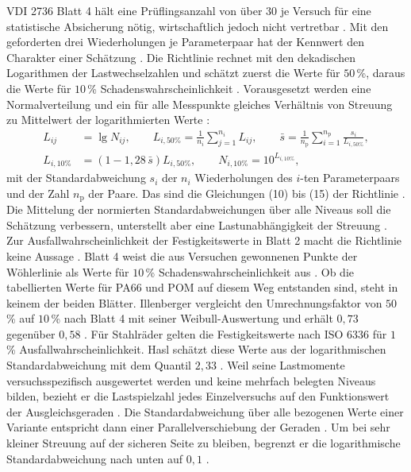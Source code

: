 VDI 2736 Blatt 4 hält eine Prüflingsanzahl von über 30 je Versuch für eine statistische Absicherung nötig, wirtschaftlich jedoch nicht vertretbar \cite[Abschnitt~4, S.~8 bis 9]{VDI2736-4}. Mit den geforderten drei Wiederholungen je Parameterpaar hat der Kennwert den Charakter einer Schätzung \cite[S.~9]{VDI2736-4}. Die Richtlinie rechnet mit den dekadischen Logarithmen der Lastwechselzahlen und schätzt zuerst die Werte für $50$\,\%, daraus die Werte für $10$\,\% Schadenswahrscheinlichkeit \cite[S.~9]{VDI2736-4}. Vorausgesetzt werden eine Normalverteilung und ein für alle Messpunkte gleiches Verhältnis von Streuung zu Mittelwert der logarithmierten Werte \cite[S.~9]{VDI2736-4}:
\begin{equation}
    \begin{aligned}
        L_{ij}     & = \lg N_{ij} , \qquad
        L_{i,50\%} = \frac{1}{n_{i}} \sum_{j=1}^{n_{i}} L_{ij} , \qquad
        \bar{s} = \frac{1}{n_{\mathrm{p}}} \sum_{i=1}^{n_{\mathrm{p}}} \frac{s_{i}}{L_{i,50\%}} , \\
        L_{i,10\%} & = \left(1 - 1{,}28\,\bar{s}\right) L_{i,50\%} , \qquad
        N_{i,10\%} = 10^{L_{i,10\%}} ,
    \end{aligned}
    \label{eq:vdi2736_10prozent}
\end{equation}
mit der Standardabweichung $s_{i}$ der $n_{i}$ Wiederholungen des $i$-ten Parameterpaars und der Zahl $n_{\mathrm{p}}$ der Paare. Das sind die Gleichungen (10) bis (15) der Richtlinie \cite[Abschnitt~4, S.~9 bis 10]{VDI2736-4}. Die Mittelung der normierten Standardabweichungen über alle Niveaus soll die Schätzung verbessern, unterstellt aber eine Lastunabhängigkeit der Streuung \cite[S.~22]{Has18}. Zur Ausfallwahrscheinlichkeit der Festigkeitswerte in Blatt 2 macht die Richtlinie keine Aussage \cite[S.~22]{Has18}. Blatt 4 weist die aus Versuchen gewonnenen Punkte der Wöhlerlinie als Werte für $10$\,\% Schadenswahrscheinlichkeit aus \cite[S.~7]{VDI2736-4}. Ob die tabellierten Werte für PA66 und POM auf diesem Weg entstanden sind, steht in keinem der beiden Blätter. Illenberger vergleicht den Umrechnungsfaktor von $50$\,\% auf $10$\,\% nach Blatt 4 mit seiner Weibull-Auswertung und erhält $0{,}73$ gegenüber $0{,}58$ \cite[Tabelle~7-3, S.~99]{Ill22}. Für Stahlräder gelten die Festigkeitswerte nach ISO 6336 für $1$\,\% Ausfallwahrscheinlichkeit. Hasl schätzt diese Werte aus der logarithmischen Standardabweichung mit dem Quantil $2{,}33$ \cite[Abschnitt~2.1.5, S.~9]{Has18}. Weil seine Lastmomente versuchsspezifisch ausgewertet werden und keine mehrfach belegten Niveaus bilden, bezieht er die Lastspielzahl jedes Einzelversuchs auf den Funktionswert der Ausgleichsgeraden \cite[Abschnitt~8.1, S.~109 bis 110]{Has18}. Die Standardabweichung über alle bezogenen Werte einer Variante entspricht dann einer Parallelverschiebung der Geraden \cite[S.~110]{Has18}. Um bei sehr kleiner Streuung auf der sicheren Seite zu bleiben, begrenzt er die logarithmische Standardabweichung nach unten auf $0{,}1$ \cite[S.~118]{Has18}.


